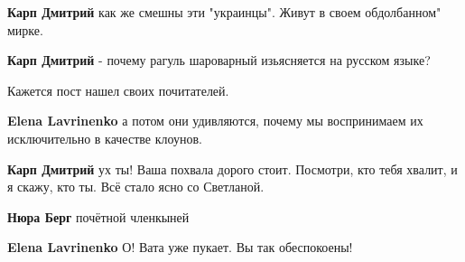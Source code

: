 \begin{itemize}
\begin{itemize}
\textbf{Карп Дмитрий} как же смешны эти "украинцы". Живут в своем обдолбанном" мирке.

 
\textbf{Карп Дмитрий} - почему рагуль шароварный изьясняется на русском языке?

 
Кажется пост нашел своих почитателей.

 
\textbf{Elena Lavrinenko} а потом они удивляются, почему мы воспринимаем их исключительно в качестве клоунов.

 
\textbf{Карп Дмитрий} ух ты! Ваша похвала дорого стоит. Посмотри, кто тебя хвалит, и я скажу, кто ты. Всё стало ясно со Светланой.

 
\textbf{Нюра Берг} почётной членкыней

 
\textbf{Elena Lavrinenko} О! Вата уже пукает. Вы так обеспокоены!

 

\end{itemize}
\end{itemize}
